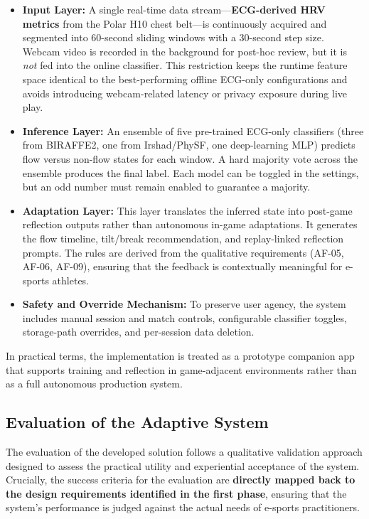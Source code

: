 \begin{itemize}
    \item \textbf{Input Layer:} A single real-time data stream—\textbf{ECG-derived HRV metrics} from the Polar H10 chest belt—is continuously acquired and segmented into 60-second sliding windows with a 30-second step size. Webcam video is recorded in the background for post-hoc review, but it is \textit{not} fed into the online classifier. This restriction keeps the runtime feature space identical to the best-performing offline ECG-only configurations and avoids introducing webcam-related latency or privacy exposure during live play.
    \item \textbf{Inference Layer:} An ensemble of five pre-trained ECG-only classifiers (three from BIRAFFE2, one from Irshad/PhySF, one deep-learning MLP) predicts flow versus non-flow states for each window. A hard majority vote across the ensemble produces the final label. Each model can be toggled in the settings, but an odd number must remain enabled to guarantee a majority.
    \item \textbf{Adaptation Layer:} This layer translates the inferred state into post-game reflection outputs rather than autonomous in-game adaptations. It generates the flow timeline, tilt/break recommendation, and replay-linked reflection prompts. The rules are derived from the qualitative requirements (AF-05, AF-06, AF-09), ensuring that the feedback is contextually meaningful for e-sports athletes.
    \item \textbf{Safety and Override Mechanism:} To preserve user agency, the system includes manual session and match controls, configurable classifier toggles, storage-path overrides, and per-session data deletion.
\end{itemize}

In practical terms, the implementation is treated as a prototype companion app that supports training and reflection in game-adjacent environments rather than as a full autonomous production system.

\subsection{Evaluation of the Adaptive System}
The evaluation of the developed solution follows a qualitative validation approach designed to assess the practical utility and experiential acceptance of the system. Crucially, the success criteria for the evaluation are \textbf{directly mapped back to the design requirements identified in the first phase}, ensuring that the system's performance is judged against the actual needs of e-sports practitioners.

